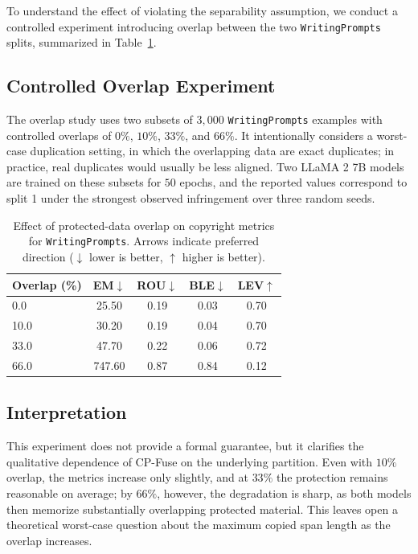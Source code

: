 To understand the effect of violating the separability assumption, we conduct a controlled experiment introducing overlap between the two \texttt{WritingPrompts} splits, summarized in Table~\ref{tab:app-cpfuse-overlap}.

\subsection{Controlled Overlap Experiment}

The overlap study uses two subsets of \(3{,}000\) \texttt{WritingPrompts} examples with controlled overlaps of \(0\%\), \(10\%\), \(33\%\), and \(66\%\). It intentionally considers a worst-case duplication setting, in which the overlapping data are exact duplicates; in practice, real duplicates would usually be less aligned. Two LLaMA 2 7B models are trained on these subsets for \(50\) epochs, and the reported values correspond to split 1 under the strongest observed infringement over three random seeds.

\begin{table}[!tbp]
\centering
\caption{Effect of protected-data overlap on copyright metrics for \texttt{WritingPrompts}. Arrows indicate preferred direction (\(\downarrow\) lower is better, \(\uparrow\) higher is better).}
\label{tab:app-cpfuse-overlap}
\begin{tabular}{lcccc}
\toprule
\textbf{Overlap (\%)} & \textbf{EM}\(\downarrow\) & \textbf{ROU}\(\downarrow\) & \textbf{BLE}\(\downarrow\) & \textbf{LEV}\(\uparrow\) \\
\midrule
0.0  & 25.50 & 0.19 & 0.03 & 0.70 \\
10.0 & 30.20 & 0.19 & 0.04 & 0.70 \\
33.0 & 47.70 & 0.22 & 0.06 & 0.72 \\
66.0 & 747.60 & 0.87 & 0.84 & 0.12 \\
\bottomrule
\end{tabular}
\end{table}

\subsection{Interpretation}

This experiment does not provide a formal guarantee, but it clarifies the qualitative dependence of CP-Fuse on the underlying partition. Even with \(10\%\) overlap, the metrics increase only slightly, and at \(33\%\) the protection remains reasonable on average; by \(66\%\), however, the degradation is sharp, as both models then memorize substantially overlapping protected material. This leaves open a theoretical worst-case question about the maximum copied span length as the overlap increases.

